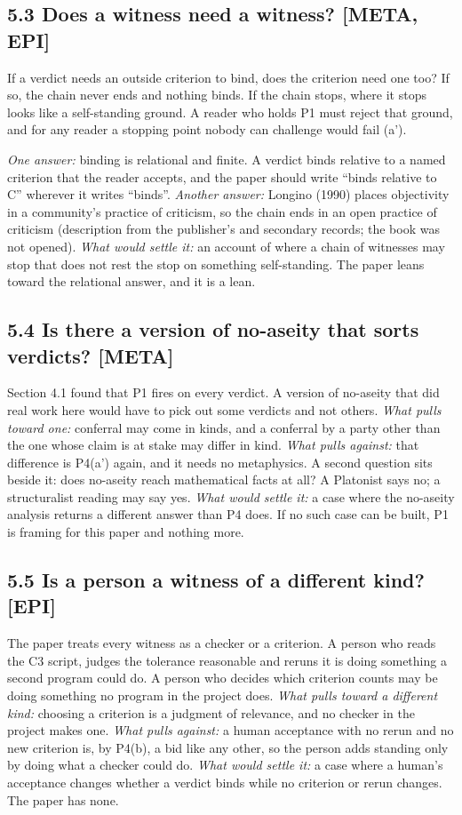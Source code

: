 \documentclass[11pt]{article}
\begin{document}
\subsection*{5.3 Does a witness need a witness? [META, EPI]}

If a verdict needs an outside criterion to bind, does the criterion need one too? If so, the chain never ends and nothing binds. If the chain stops, where it stops looks like a self-standing ground. A reader who holds P1 must reject that ground, and for any reader a stopping point nobody can challenge would fail (a').

\emph{One answer:} binding is relational and finite. A verdict binds relative to a named criterion that the reader accepts, and the paper should write ``binds relative to C'' wherever it writes ``binds''. \emph{Another answer:} Longino (1990) places objectivity in a community's practice of criticism, so the chain ends in an open practice of criticism (description from the publisher's and secondary records; the book was not opened). \emph{What would settle it:} an account of where a chain of witnesses may stop that does not rest the stop on something self-standing. The paper leans toward the relational answer, and it is a lean.

\subsection*{5.4 Is there a version of no-aseity that sorts verdicts? [META]}

Section 4.1 found that P1 fires on every verdict. A version of no-aseity that did real work here would have to pick out some verdicts and not others. \emph{What pulls toward one:} conferral may come in kinds, and a conferral by a party other than the one whose claim is at stake may differ in kind. \emph{What pulls against:} that difference is P4(a') again, and it needs no metaphysics. A second question sits beside it: does no-aseity reach mathematical facts at all? A Platonist says no; a structuralist reading may say yes. \emph{What would settle it:} a case where the no-aseity analysis returns a different answer than P4 does. If no such case can be built, P1 is framing for this paper and nothing more.

\subsection*{5.5 Is a person a witness of a different kind? [EPI]}

The paper treats every witness as a checker or a criterion. A person who reads the C3 script, judges the tolerance reasonable and reruns it is doing something a second program could do. A person who decides which criterion counts may be doing something no program in the project does. \emph{What pulls toward a different kind:} choosing a criterion is a judgment of relevance, and no checker in the project makes one. \emph{What pulls against:} a human acceptance with no rerun and no new criterion is, by P4(b), a bid like any other, so the person adds standing only by doing what a checker could do. \emph{What would settle it:} a case where a human's acceptance changes whether a verdict binds while no criterion or rerun changes. The paper has none.
\end{document}
